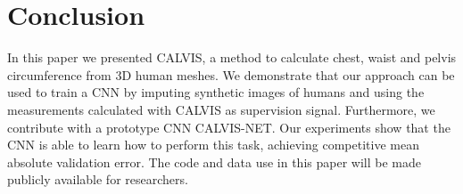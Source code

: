\documentclass[runningheads, orivec]{llncs}
\begin{document}
\section{Conclusion}
In this paper we presented CALVIS, a method to calculate chest, waist and pelvis circumference from 3D human meshes. 
We demonstrate that our approach can be used to train a CNN by imputing synthetic images of humans and using the measurements calculated with CALVIS as supervision signal.
Furthermore, we contribute with a prototype CNN CALVIS-NET. Our experiments show that the CNN is able to learn how to perform this task, achieving competitive mean absolute validation error.
The code 
and data use 
in this paper will be made publicly available for researchers.
%
%
%


%
\end{document}
